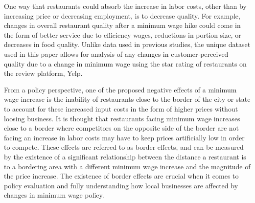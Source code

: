 \documentclass[11pt]{article}
\begin{document}

One way that restaurants could absorb the increase in labor costs, other than by increasing price or decreasing employment, is to decrease quality. For example, changes in overall restaurant quality after a minimum wage hike could come in the form of better service due to efficiency wages, reductions in portion size, or decreases in food quality.  Unlike data used in previous studies, the unique dataset used in this paper allows for analysis of any changes in customer-perceived quality due to a change in minimum wage using the star rating of restaurants on the review platform, Yelp. 



From a policy perspective, one of the proposed negative effects of a minimum wage increase is the inability of restaurants close to the border of the city or state to account for these increased input costs in the form of higher prices without loosing business. It is thought that restaurants facing minimum wage increases close to a border where competitors on the opposite side of the border are not facing an increase in labor costs may have to keep prices artificially low in order to compete. These effects are referred to as border effects, and can be measured by the existence of a significant relationship between the distance a restaurant is to a bordering area with a different minimum wage increase and the magnitude of the price increase. The existence of border effects are crucial when it comes to policy evaluation and fully understanding how local businesses are affected by changes in minimum wage policy. 
\end{document}
